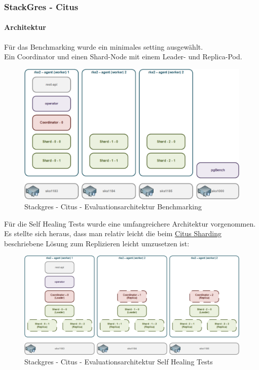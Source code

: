 
\begin{flushleft}
    \subsubsection{StackGres - Citus}
    \paragraph{Architektur}
    Für das Benchmarking wurde ein minimales setting ausgewählt.\\
    Ein Coordinator und einen Shard-Node mit einem Leader- und Replica-Pod.\\
    \begin{figure}[H]
        \centering
        \includegraphics[width=0.8\linewidth]{source/implementation/evaluation/postgresql_ha_solutions/stackgres/stackgres-citus-evaluation-architecture}
        \caption{Stackgres - Citus - Evaluationsarchitektur Benchmarking}
        \label{fig:stackgres-citus-evaluation-architecture}
    \end{figure}
    Für die Self Healing Tests wurde eine umfangreichere Architektur vorgenommen.\\
    Es stellte sich heraus, dass man relativ leicht die beim \hyperref[subpar:citus_sharding]{Citus Sharding} beschriebene Lösung zum Replizieren leicht umzusetzen ist:
    \begin{figure}[H]
        \centering
        \includegraphics[width=1\linewidth]{source/implementation/evaluation/postgresql_ha_solutions/stackgres/stackgres_citus_architecture_self_healing_test}
        \caption{Stackgres - Citus - Evaluationsarchitektur Self Healing Tests}
        \label{fig:stackgres_citus_architecture_self_healing_test}
    \end{figure}
\end{flushleft}
